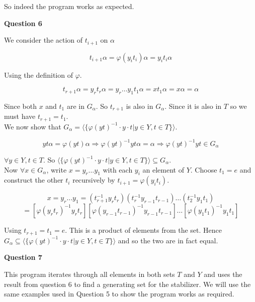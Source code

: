 \documentclass[12pt]{extarticle}
\begin{document}
So indeed the program works as expected.\\

\begin{center}
\textbf{Question 6}
\end{center}

We consider the action of $t_{i+1}$ on $\alpha$

$$t_{i+1}\alpha = \varphi(y_it_i)\alpha = y_it_i\alpha$$

Using the definition of $\varphi$.

$$t_{r+1}\alpha = y_rt_r\alpha = y_r\dots y_1 t_1 \alpha = xt_1\alpha = x\alpha = \alpha$$

Since both $x$ and $t_1$ are in $G_\alpha$. So $t_{r+1}$ is also in $G_\alpha$. Since it is also in $T$ so we must have $t_{r+1} = t_1$.\\

We now show that $G_\alpha = \langle\lbrace \varphi(yt)^{-1}\cdot y\cdot t|y \in Y, t \in T \rbrace \rangle$.

$$yt\alpha = \varphi(yt)\alpha \Rightarrow \varphi(yt)^{-1}yt\alpha = \alpha \Rightarrow \varphi(yt)^{-1}yt \in G_\alpha$$

$\forall y \in Y, t \in T $. So $\langle \lbrace \varphi(yt)^{-1}\cdot y\cdot t|y \in Y, t \in T \rbrace \rangle \subseteq G_\alpha$.\\

Now $\forall x \in G_\alpha$, write $x = y_r\dots y_1$ with each $y_i$ an element of $Y$. Choose $t_1 = e$ and construct the other $t_i$ recursively by $t_{i+1} = \varphi(y_it_i)$.

$$x = y_r\dots y_1 = (t_{r+1}^{-1}y_rt_r)(t_r^{-1}y_{r-1}t_{r-1})\dots (t_2^{-1}y_1t_1)$$
$$ = [\varphi(y_rt_r)^{-1}y_rt_r][\varphi(y_{r-1}t_{r-1})^{-1}y_{r-1}t_{r-1}]\dots  [\varphi(y_1t_1)^{-1}y_1t_1]$$

Using $t_{r+1} = t_1 = e$. This is a product of elements from the set. Hence $ G_\alpha \subseteq \langle \lbrace \varphi(yt)^{-1}\cdot y\cdot t|y \in Y, t \in T \rbrace \rangle$ and so the two are in fact equal.

\begin{center}
\textbf{Question 7}
\end{center}

This program iterates through all elements in both sets $T$ and $Y$ and uses the result from question 6 to find a generating set for the stabilizer. We will use the same examples used in Question 5 to show the program works as required.\\
\end{document}
